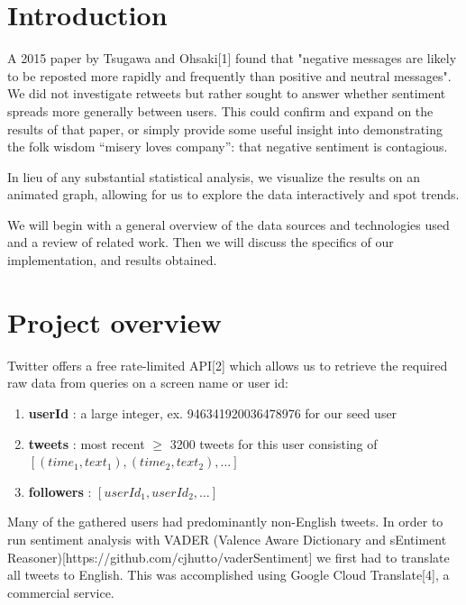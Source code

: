 \documentclass[12pt]{article}
\begin{document}
\section{Introduction}

A 2015 paper by Tsugawa and Ohsaki[1] found that "negative messages are likely to be reposted more rapidly and frequently than positive and neutral messages". We did not investigate retweets but rather sought to answer whether sentiment spreads more generally between users. This could confirm and expand on the results of that paper, or simply provide some useful insight into demonstrating the folk wisdom “misery loves company”: that negative sentiment is contagious.\newline

In lieu of any substantial statistical analysis, we visualize the results on an animated graph, allowing for us to explore the data interactively and spot trends.\newline

We will begin with a general overview of the data sources and technologies used and a review of related work. Then we will discuss the specifics of our implementation, and results obtained.


\section{Project overview}

Twitter offers a free rate-limited API[2] which allows us to retrieve the required raw data from queries on a screen name or user id:
\begin{enumerate}
    \item \textbf{userId} : a large integer, ex. 946341920036478976 for our seed user
    \item \textbf{tweets} : most recent $\geq$ 3200 tweets for this user consisting of $[(time_1, text_1), (time_2, text_2), \dots]$ 
    \item \textbf{followers} : $[userId_1, userId_2, \dots]$
\end{enumerate}

Many of the gathered users had predominantly non-English tweets. In order to run sentiment analysis with VADER (Valence Aware Dictionary and sEntiment Reasoner)[https://github.com/cjhutto/vaderSentiment] we first had to translate all tweets to English. This was accomplished using Google Cloud Translate[4], a commercial service.\newline
\end{document}
